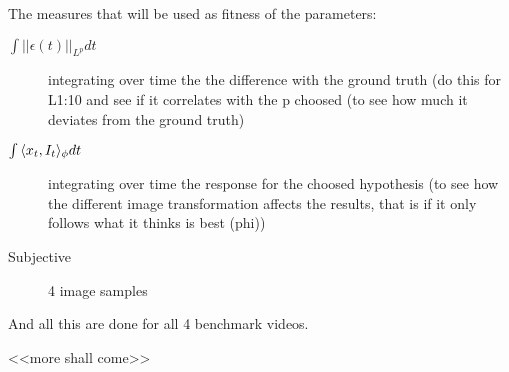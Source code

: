 The measures that will be used as fitness of the parameters:
    \begin{description}
        \item[$\int{||\epsilon(t)||_{L^p}}dt$]
            integrating over time the the difference
            with the ground truth (do this for L{1:10} and see if it correlates with
            the p choosed (to see how much it deviates from the ground truth)
        \item[$\int{\langle x_t, I_t\rangle_{\phi} }dt$] 
            integrating over time the response
            for the choosed hypothesis (to see how the different image transformation
            affects the results, that is if it only follows what it thinks is best
            (phi))
        \item[Subjective] 4 image samples
    \end{description}
And all this are done for all 4 benchmark videos.

<<more shall come>>


